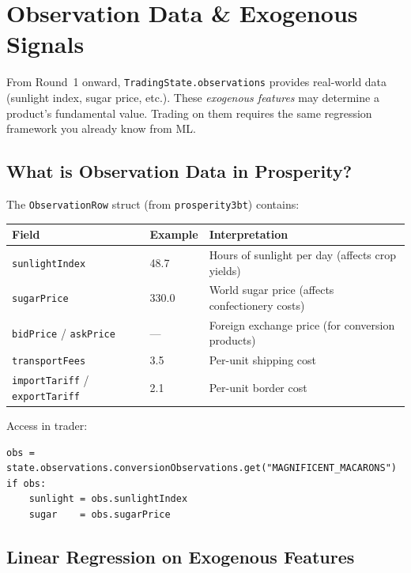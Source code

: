\documentclass[12pt,a4paper,openany]{report}
\theoremstyle{definition}
\begin{document}

\chapter{Observation Data \& Exogenous Signals}

From Round~1 onward, \texttt{TradingState.observations} provides real-world data (sunlight index, sugar price, etc.). These \emph{exogenous features} may determine a product's fundamental value. Trading on them requires the same regression framework you already know from ML.

\section{What is Observation Data in Prosperity?}

The \texttt{ObservationRow} struct (from \texttt{prosperity3bt}) contains:

\begin{center}
\renewcommand{\arraystretch}{1.4}
\begin{tabular}{lll}
\toprule
\textbf{Field} & \textbf{Example} & \textbf{Interpretation} \\
\midrule
\texttt{sunlightIndex} & 48.7 & Hours of sunlight per day (affects crop yields) \\
\texttt{sugarPrice} & 330.0 & World sugar price (affects confectionery costs) \\
\texttt{bidPrice} / \texttt{askPrice} & — & Foreign exchange price (for conversion products) \\
\texttt{transportFees} & 3.5 & Per-unit shipping cost \\
\texttt{importTariff} / \texttt{exportTariff} & 2.1 & Per-unit border cost \\
\bottomrule
\end{tabular}
\end{center}

Access in trader:
\begin{lstlisting}
obs = state.observations.conversionObservations.get("MAGNIFICENT_MACARONS")
if obs:
    sunlight = obs.sunlightIndex
    sugar    = obs.sugarPrice
\end{lstlisting}

\section{Linear Regression on Exogenous Features}
\end{document}
